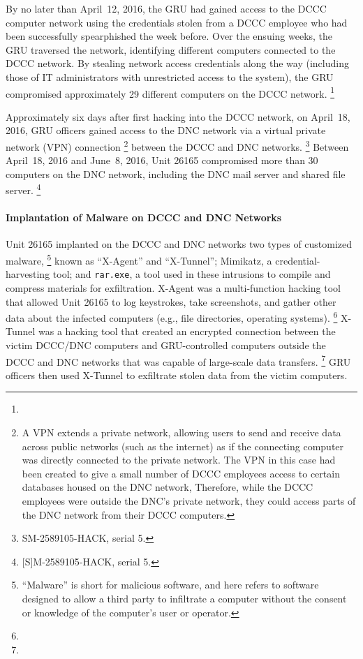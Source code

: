 By no later than April~12, 2016, the GRU had gained access to the DCCC computer network using the credentials stolen from a DCCC employee who had been successfully spearphished the week before.
Over the ensuing weeks, the GRU traversed the network, identifying different computers connected to the DCCC network.
By stealing network access credentials along the way (including those of IT administrators with unrestricted access to the system), the GRU compromised approximately 29 different computers on the DCCC network.%
\footnote{}

Approximately six days after first hacking into the DCCC network, on April~18, 2016, GRU officers gained access to the DNC network via a virtual private network (VPN) connection%
\footnote{A VPN extends a private network, allowing users to send and receive data across public networks (such as the internet) as if the connecting computer was directly connected to the private network.
The VPN in this case had been created to give a small number of DCCC employees access to certain databases housed on the DNC network, Therefore, while the DCCC employees were outside the DNC's private network, they could access parts of the DNC network from their DCCC computers.}
between the DCCC and DNC networks.%
\footnote{ SM-2589105-HACK, serial 5.}
Between April~18, 2016 and June~8, 2016, Unit 26165 compromised more than 30 computers on the DNC network, including the DNC mail server and shared file server.%
\footnote{ [S]M-2589105-HACK, serial 5.}

\paragraph{Implantation of Malware on DCCC and DNC Networks}

Unit 26165 implanted on the DCCC and DNC networks two types of customized malware,%
\footnote{``Malware'' is short for malicious software, and here refers to software designed to allow a third party to infiltrate a computer without the consent or knowledge of the computer's user or operator.}
known as ``X-Agent'' and ``X-Tunnel'';  Mimikatz, a credential-harvesting tool; and \verb+rar.exe+, a tool used in these intrusions to compile and compress materials for exfiltration.
X-Agent was a multi-function hacking tool that allowed Unit 26165 to log keystrokes, take screenshots, and gather other data about the infected computers (e.g., file directories,  operating systems).%
\footnote{}
X-Tunnel was a  hacking tool that created an encrypted connection between the victim DCCC/DNC computers and GRU-controlled computers outside the DCCC and DNC networks that was capable of large-scale data transfers.%
\footnote{}
GRU officers then used X-Tunnel to exfiltrate stolen data from the victim computers.


